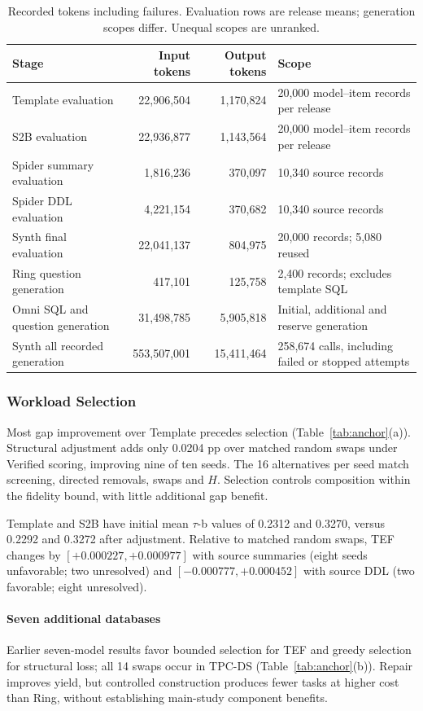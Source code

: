 \begin{table}[t]\centering\small
\caption{Recorded tokens including failures. Evaluation rows are release means; generation scopes differ. Unequal scopes are unranked.}
\label{tab:cost}
\begin{tabular}{lrrl}\toprule
Stage & Input tokens & Output tokens & Scope\\\midrule
Template evaluation &22,906,504&1,170,824&20,000 model--item records per release\\
S2B evaluation &22,936,877&1,143,564&20,000 model--item records per release\\
Spider summary evaluation &1,816,236&370,097&10,340 source records\\
Spider DDL evaluation &4,221,154&370,682&10,340 source records\\
Synth final evaluation &22,041,137&804,975&20,000 records; 5,080 reused\\\midrule
Ring question generation &417,101&125,758&2,400 records; excludes template SQL\\
Omni SQL and question generation &31,498,785&5,905,818&Initial, additional and reserve generation\\
Synth all recorded generation &553,507,001&15,411,464&258,674 calls, including failed or stopped attempts\\\bottomrule
\end{tabular}\end{table}

\subsubsection{Workload Selection}\label{sec:selection}
Most gap improvement over Template precedes selection (Table~\ref{tab:anchor}(a)). Structural adjustment adds only 0.0204 pp over matched random swaps under Verified scoring, improving nine of ten seeds. The 16 alternatives per seed match screening, directed removals, swaps and $H$. Selection controls composition within the fidelity bound, with little additional gap benefit.



Template and S2B have initial mean $\tau$-b values of 0.2312 and 0.3270, versus 0.2292 and 0.3272 after adjustment. Relative to matched random swaps, TEF changes by $[+0.000227,+0.000977]$ with source summaries (eight seeds unfavorable; two unresolved) and $[-0.000777,+0.000452]$ with source DDL (two favorable; eight unresolved).

\paragraph{Seven additional databases}
Earlier seven-model results favor bounded selection for TEF and greedy selection for structural loss; all 14 swaps occur in TPC-DS (Table~\ref{tab:anchor}(b)). Repair improves yield, but controlled construction produces fewer tasks at higher cost than Ring, without establishing main-study component benefits.

